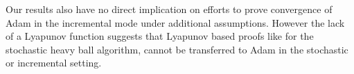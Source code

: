 \documentclass[runningheads]{llncs}
\begin{document}
Our results also have no direct implication on efforts to prove convergence of Adam in 
the incremental mode under additional assumptions. However the lack of a Lyapunov function
suggests that Lyapunov based proofs like \cite{Gadat.2018} for the stochastic heavy ball algorithm, cannot be transferred to Adam in the stochastic or incremental setting.

\printbibliography
\end{document}
